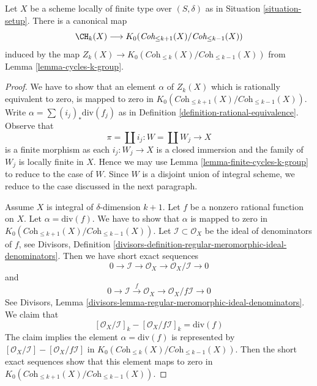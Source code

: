 \begin{lemma}
\label{lemma-from-chow-to-K}
Let $X$ be a scheme locally of finite type over $(S, \delta)$
as in Situation \ref{situation-setup}. There is a canonical map
$$
\CH_k(X)
\longrightarrow
K_0(\textit{Coh}_{\leq k + 1}(X)/\textit{Coh}_{\leq k - 1}(X))
$$
induced by the map
$Z_k(X) \to K_0(\textit{Coh}_{\leq k}(X)/\textit{Coh}_{\leq k - 1}(X))$
from Lemma \ref{lemma-cycles-k-group}.
\end{lemma}

\begin{proof}
We have to show that an element $\alpha$ of $Z_k(X)$ which is rationally
equivalent to zero, is mapped to zero in
$K_0(\textit{Coh}_{\leq k + 1}(X)/\textit{Coh}_{\leq k - 1}(X))$.
Write $\alpha = \sum (i_j)_*\text{div}(f_j)$ as in
Definition \ref{definition-rational-equivalence}.
Observe that
$$
\pi = \coprod i_j : W = \coprod W_j \longrightarrow X
$$
is a finite morphism as each $i_j : W_j \to X$ is a closed immersion
and the family of $W_j$ is locally finite in $X$. Hence we may use
Lemma \ref{lemma-finite-cycles-k-group} to reduce to the case of $W$.
Since $W$ is a disjoint union of integral scheme, we reduce
to the case discussed in the next paragraph.

\medskip\noindent
Assume $X$ is integral of $\delta$-dimension $k + 1$.
Let $f$ be a nonzero rational function on $X$.
Let $\alpha = \text{div}(f)$. We have to show that
$\alpha$ is mapped to zero in
$K_0(\textit{Coh}_{\leq k + 1}(X)/\textit{Coh}_{\leq k - 1}(X))$.
Let $\mathcal{I} \subset \mathcal{O}_X$ be the ideal of denominators
of $f$, see Divisors, Definition
\ref{divisors-definition-regular-meromorphic-ideal-denominators}.
Then we have short exact sequences
$$
0 \to \mathcal{I} \to \mathcal{O}_X \to \mathcal{O}_X/\mathcal{I} \to 0
$$
and
$$
0 \to \mathcal{I} \xrightarrow{f} \mathcal{O}_X \to
\mathcal{O}_X/f\mathcal{I} \to 0
$$
See Divisors, Lemma
\ref{divisors-lemma-regular-meromorphic-ideal-denominators}.
We claim that
$$
[\mathcal{O}_X/\mathcal{I}]_k - [\mathcal{O}_X/f\mathcal{I}]_k =
\text{div}(f)
$$
The claim implies the element $\alpha = \text{div}(f)$ is represented by
$[\mathcal{O}_X/\mathcal{I}] - [\mathcal{O}_X/f\mathcal{I}]$
in $K_0(\textit{Coh}_{\leq k}(X)/\textit{Coh}_{\leq k - 1}(X))$.
Then the short exact sequences show that this element maps to
zero in $K_0(\textit{Coh}_{\leq k + 1}(X)/\textit{Coh}_{\leq k - 1}(X))$.


\end{proof}

